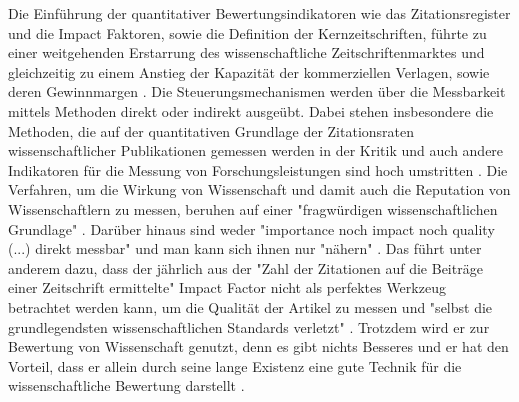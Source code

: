 Die Einführung der quantitativer Bewertungsindikatoren wie das Zitationsregister und die Impact Faktoren, sowie die Definition der Kernzeitschriften, führte zu einer weitgehenden Erstarrung des wissenschaftliche Zeitschriftenmarktes und gleichzeitig zu einem Anstieg der Kapazität der kommerziellen Verlagen, sowie deren Gewinnmargen \cite{CREATe_2014}. Die Steuerungsmechanismen werden über die Messbarkeit mittels Methoden direkt oder indirekt ausgeübt. Dabei stehen insbesondere die Methoden, die auf der quantitativen Grundlage der Zitationsraten wissenschaftlicher Publikationen gemessen werden in der Kritik \cite{Brembs_2013} \cite{Dong_2005} und auch andere Indikatoren für die Messung von Forschungsleistungen sind hoch umstritten \cite{Hornbostel_1997} \cite{Hicks_1996} \cite{Havemann_2002} \cite{Warnke_2012}. Die Verfahren, um die Wirkung von Wissenschaft und damit auch die Reputation von Wissenschaftlern zu messen, beruhen auf einer "fragwürdigen wissenschaftlichen Grundlage" \cite[:10]{Osterloh_2008}. Darüber hinaus sind weder "importance noch impact noch quality (...) direkt messbar" und man kann sich ihnen nur "nähern" \cite[:188]{Hornbostel_1997}. Das führt unter anderem dazu, dass der jährlich aus der "Zahl der Zitationen auf die Beiträge einer Zeitschrift ermittelte" \cite[:26]{Weishaupt_2009} Impact Factor nicht als perfektes Werkzeug betrachtet werden kann, um die Qualität der Artikel zu messen \cite{Garfield_1999} und "selbst die grundlegendsten wissenschaftlichen Standards verletzt" \cite{Brembs_2013}. Trotzdem wird er zur Bewertung von Wissenschaft genutzt, denn es gibt nichts Besseres und er hat den Vorteil, dass er allein durch seine lange Existenz eine gute Technik für die wissenschaftliche Bewertung darstellt \cite{Garfield_1999} \cite{Weishaupt_2009}.

